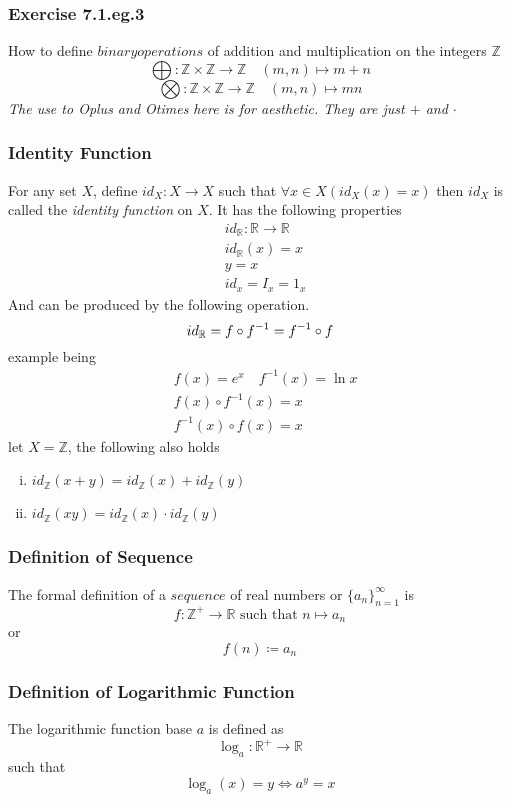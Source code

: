 \documentclass[12pt]{book}
\newcommand{\Z}{\mathbb{Z}}
\newcommand{\R}{\mathbb{R}}
\newcommand{\paren}[1]{\left( #1 \right)}
\begin{document}
\subsubsection{Exercise 7.1.eg.3}
How to define $binary operations$ of addition and multiplication on the integers $\Z$
\[
\bigoplus \colon \Z \times \Z \to \Z \quad (m,n) \mapsto m+n
\]
\[
\bigotimes \colon \Z \times \Z \to \Z \quad (m,n) \mapsto mn
\]
\textit{The use to Oplus and Otimes here is for aesthetic. They are just $+$ and $\cdot$}

\subsubsection{Identity Function}
For any set $X$, define $id_X:X \to X$ such that $\forall x \in X \paren{id_X\paren{x}=x}$ then $id_X $ is called the \textit{identity function} on $X$. It has the following properties
\begin{align*}
    &id_\R \colon \R \to \R\\
    &id_\R(x) = x\\
    &y = x\\
    &id_x = I_x = 1_x
\end{align*}
And can be produced by the following operation.
\[
    id_\R = f \circ f^{-1} = f^{-1} \circ f\\
\]
example being
\begin{align*}
    &f(x) = e^x \quad f^{-1}(x) = \ln{x}\\
    &f(x) \circ f^{-1}(x)= x\\
    &f^{-1}(x) \circ f(x)= x
\end{align*}
let $X = \Z$, the following also holds
\begin{enumerate}[i.]
    \item $id_\Z(x+y) = id_\Z(x)    +  id_\Z(y)$
    \item $id_\Z(xy)  = id_\Z(x) \cdot id_\Z(y)$
\end{enumerate}

\subsubsection{Definition of Sequence}
The formal definition of a $sequence$ of real numbers or $\{ a_n\}_{n=1}^{\infty}$ is 
\[
f \colon \Z^+ \to \R  \text{ such that } n \mapsto a_n
\]
or
\[
f(n) \coloneqq a_n
\]

\subsubsection{Definition of Logarithmic Function}
The logarithmic function base $a$ is defined as
\[
\log_a \colon \R^+ \to \R 
\]
such that
\[
\log_a(x) = y \iff a^y = x
\]
\end{document}
